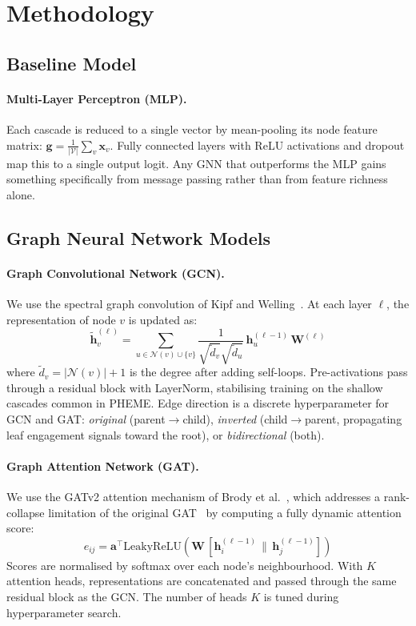 \documentclass[runningheads]{llncs}
\begin{document}
\section{Methodology}

\subsection{Baseline Model}

\paragraph{Multi-Layer Perceptron (MLP).}
Each cascade is reduced to a single vector by mean-pooling its node feature
matrix: $\mathbf{g} = \frac{1}{|\mathcal{V}|}\sum_{v}\mathbf{x}_v$. Fully
connected layers with ReLU activations and dropout map this to a single output
logit. Any GNN that outperforms the MLP gains something specifically from
message passing rather than from feature richness alone.

\subsection{Graph Neural Network Models}

\paragraph{Graph Convolutional Network (GCN).}
We use the spectral graph convolution of Kipf and Welling~\cite{kipf2017semi}.
At each layer $\ell$, the representation of node $v$ is updated as:
%
\begin{equation}
  \tilde{\mathbf{h}}_v^{(\ell)} =
    \sum_{u \in \mathcal{N}(v) \cup \{v\}}
      \frac{1}{\sqrt{\tilde{d}_v}\sqrt{\tilde{d}_u}}\,
      \mathbf{h}_u^{(\ell-1)}\, \mathbf{W}^{(\ell)}
\end{equation}
%
where $\tilde{d}_v = |\mathcal{N}(v)| + 1$ is the degree after adding self-loops.
Pre-activations pass through a residual block with LayerNorm, stabilising
training on the shallow cascades common in PHEME. Edge direction is a discrete hyperparameter for GCN and GAT:
\textit{original} (parent$\to$child), \textit{inverted} (child$\to$parent,
propagating leaf engagement signals toward the root), or
\textit{bidirectional} (both).

\paragraph{Graph Attention Network (GAT).}
We use the GATv2 attention mechanism of Brody et al.~\cite{brody2022gatv2}, which
addresses a rank-collapse limitation of the original
GAT~\cite{velickovic2018gat} by computing a fully dynamic attention score:
%
\begin{equation}
  e_{ij} = \mathbf{a}^\top
    \mathrm{LeakyReLU}\!\left(
      \mathbf{W}\, [\mathbf{h}_i^{(\ell-1)} \,\|\, \mathbf{h}_j^{(\ell-1)}]
    \right)
\end{equation}
%
Scores are normalised by softmax over each node's neighbourhood.
With $K$ attention heads, representations are concatenated and passed through
the same residual block as the GCN. The number of heads $K$ is tuned
during hyperparameter search.
\end{document}
